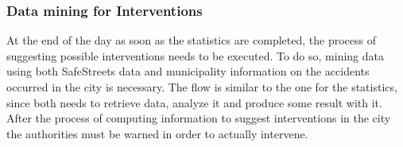\subsubsection{Data mining for Interventions}
At the end of the day as soon as the statistics are completed, the process of suggesting possible interventions needs to be executed. To do so, mining data using both SafeStreets data and municipality information on the accidents occurred in the city is necessary.
The flow is similar to the one for the statistics, since both needs to retrieve data, analyze it and produce some result with it.
After the process of computing information to suggest interventions in the city the authorities must be warned in order to actually intervene.
\\
\\
\\
\\
\\
\clearpage